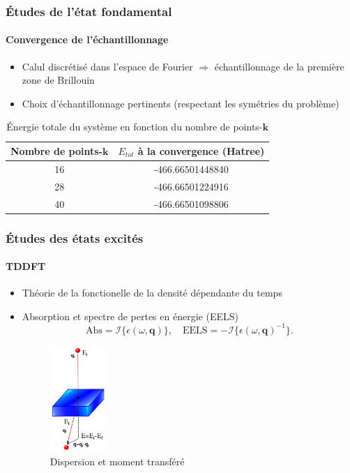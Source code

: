 \documentclass[a4paper, 12pt, twoside, titlepage, french]{beamer}
\begin{document}
\begin{frame}
\frametitle{Études de l'état fondamental}
\framesubtitle{Convergence de l'échantillonnage}
\begin{itemize}
\item Calul discrétisé dans l'espace de Fourier $\Longrightarrow$ échantillonnage de la première zone de Brillouin
\item Choix d'échantillonnage pertinents (respectant les symétries du problème)

\end{itemize}
\begin{table}[ht]
  \caption{Énergie totale du système en fonction du nombre de points-$\textbf{k}$}
  \centering
  \begin{tabular}{c c}
    \hline
    Nombre de points-$\textbf{k}$  &  $E_{tot}$ à la convergence (Hatree)
    \\
    \hline
    16    &  -466.66501448840
    \\
    28    &  -466.66501224916
    \\
    40    &  -466.66501098806
    \\
    \hline
  \end{tabular}
\end{table}

\end{frame}

\begin{frame}
\frametitle{Études des états excités}
\framesubtitle{TDDFT}
\begin{itemize}
\item Théorie de la fonctionelle de la densité dépendante du temps
\item Absorption et spectre de pertes en énergie (EELS)
\begin{equation}
  \textrm{Abs} = \mathcal{I}\{\epsilon(\omega, \textbf{q})\},
  \quad
  \textrm{EELS} = -\mathcal{I}\{\epsilon(\omega, \textbf{q})^{-1}\}.
\end{equation}

\begin{figure}[!h]
  \includegraphics[width=0.2\textwidth]{eels}
  \caption{Dispersion et moment transféré}
\end{figure}
\end{itemize}
\end{frame}
\end{document}
